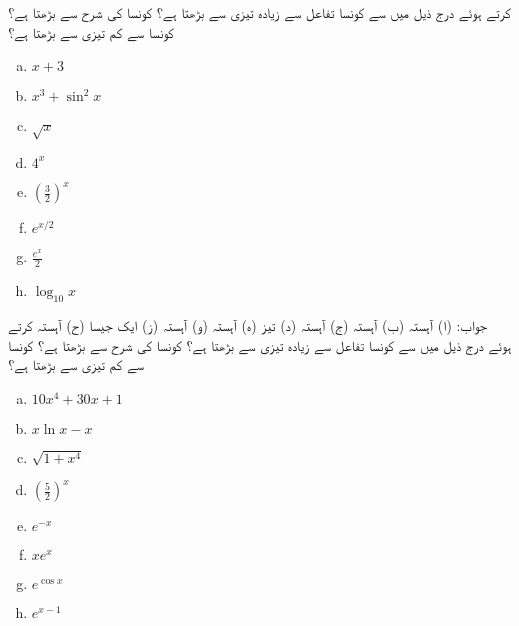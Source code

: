  کرتے ہوئے درج ذیل میں سے کونسا تفاعل  سے زیادہ تیزی سے بڑھتا ہے؟ کونسا  کی شرح سے بڑھتا ہے؟  کونسا  سے کم تیزی سے بڑھتا ہے؟
\begin{multicols}{4}
\begin{enumerate}[a.]
\item
$x+3$
\item
$x^3+\sin^2x$
\item
$\sqrt{x}$
\item
$4^x$
\item
$(\tfrac{3}{2})^x$
\item
$e^{x/2}$
\item
$\frac{e^x}{2}$
\item
$\log_{10}x$
\end{enumerate}
\end{multicols}
جواب:\quad
(ا) آہستہ (ب) آہستہ (ج) آہستہ (د) تیز (ہ) آہستہ  (و) آہستہ (ز) ایک جیسا (ح) آہستہ
 کرتے ہوئے درج ذیل میں سے کونسا تفاعل  سے زیادہ تیزی سے بڑھتا ہے؟ کونسا  کی شرح سے بڑھتا ہے؟  کونسا  سے کم تیزی سے بڑھتا ہے؟
\begin{multicols}{4}
\begin{enumerate}[a.]
\item
$10x^4+30x+1$
\item
$x\ln x-x$
\item
$\sqrt{1+x^4}$
\item
$(\tfrac{5}{2})^x$
\item
$e^{-x}$
\item
$xe^x$
\item
$e^{\cos x}$
\item
$e^{x-1}$
\end{enumerate}
\end{multicols}

